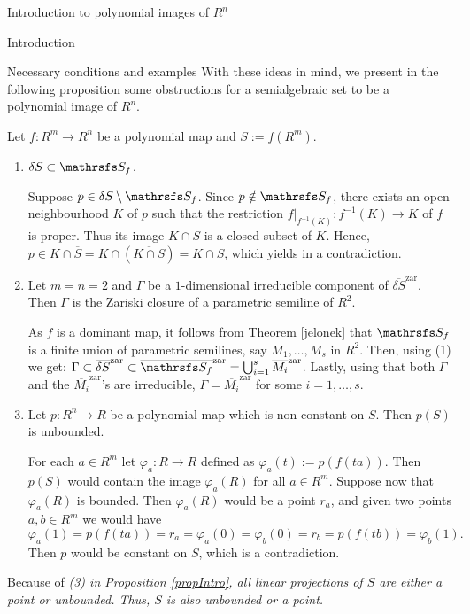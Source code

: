 \documentclass[11pt, a4paper, english, twoside, notitlepage, openright]{report}
\begin{document}
\begin{chapter}{Introduction to polynomial images of $R^n$}
\begin{section}{Introduction}
\begin{subsection}{Necessary conditions and examples}
With these ideas in mind, we present in the following proposition some obstructions for a semialgebraic set to be a polynomial image of $R^n$. 
\begin{proposition}\label{propIntro} Let $f: R^m\to R^n$ be a polynomial map and $S:=f(R^m)$.
\begin{enumerate}[\em(1)\em]
\item $\delta S \subset\S_f$.
\begin{Proof} Suppose $p\in\delta S\setminus \S_f$. Since $p\notin\S_f$, there exists an open neighbourhood $K$ of $p$ such that the restriction $f|_{f^{-1}(K)}:f^{-1}(K)\to K$ of $f$ is proper. Thus its image $K\cap S$ is a closed subset of $K$. Hence, $p\in K\cap\overline{S}=K\cap(\overline{K\cap S})=K\cap S$, which yields in a contradiction.
\end{Proof}
\item Let $m=n=2$ and $\Gamma$ be a $1$-dimensional irreducible component of $\overline{\delta S}^{\text{zar}}$. Then $\Gamma$ is the Zariski closure of a parametric semiline of $R^2$.
\begin{Proof} As $f$ is a dominant map, it follows from Theorem \ref{jelonek} that $\S_f$ is a finite union of parametric semilines, say $M_1,\dots, M_s$ in $R^2$. Then, using (1) we get: $\Gamma\subset\overline{\delta S}^{\text{zar}}\subset \overline{\S_f}^{\text{zar}}=\bigcup_{i=1}^s\overline{M_i}^{\text{zar}}$. Lastly, using that both $\Gamma$ and the $\overline{M_i}^{\text{zar}}$'s are irreducible, $\Gamma=\overline{M_i}^{\text{zar}}$ for some $i=1,\dots,s$.
\end{Proof}
\item Let $p:R^n\to R$ be a polynomial map which is non-constant on $S$. Then $p(S)$ is unbounded.
\begin{Proof} For each $a \in R^m$ let $\varphi_a:R\to R$ defined as $\varphi_a(t):=p(f(ta))$. Then $p(S)$ would contain the image $\varphi_a(R)$ for all $a\in R^m$. Suppose now that $\varphi_a(R)$ is bounded. Then $\varphi_a(R)$ would be a point $r_a$, and given two points $a,b\in R^m$ we would have
$$ 
\varphi_a(1)=p(f(ta))=r_a=\varphi_a(0)=\varphi_b(0)=r_b=p(f(tb))=\varphi_b(1).
$$ 
Then $p$ would be constant on $S$, which is a contradiction.
\end{Proof}
\end{enumerate}
\end{proposition}	
\begin{corollary} Because of \em (3) \em in Proposition \em \ref{propIntro}, \em all linear projections of $S$ are either a point or unbounded. Thus, $S$ is also unbounded or a point.
\end{corollary}
	

\end{subsection}
\end{section}
\end{chapter}
\end{document}
